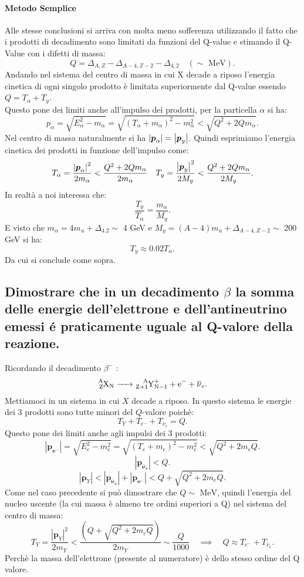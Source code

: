 \paragraph{Metodo Semplice}%
Alle stesse conclusioni si arriva con molta meno sofferenza utilizzando il fatto che i prodotti di decadimento sono limitati da funzioni del Q-value e stimando il Q-Value con i difetti di massa:
\[
	Q = \Delta_{A,Z} - \Delta_{A-4,Z-2} -\Delta_{4,2} \quad \left( \sim \text{ MeV} \right) 
.\]
Andando nel sistema del centro di massa in cui X decade a riposo l'energia cinetica di ogni singolo prodotto è limitata superiormente dal Q-value essendo $Q = T_{\alpha}+ T_{y}$.\\
Questo pone dei limiti anche all'impulso dei prodotti, per la particella $\alpha$ si ha:
\[
	p_{\alpha}= \sqrt{E_{\alpha}^2-m_{\alpha}}= \sqrt{\left( T_{\alpha}+m_{\alpha}\right)^2- m_{\alpha}^2 } < \sqrt{Q^2+2Qm_{\alpha}} 
.\] 
Nel centro di massa naturalmente si ha $\left| \boldsymbol{p}_{\alpha} \right| = \left| \boldsymbol{p}_{y} \right| $. Quindi esprimiamo l'energia cinetica dei prodotti in  funzione dell'impulso come:
\begin{align*}
	&T_{\alpha} = \frac{\left| \boldsymbol{p}_{\alpha} \right|^2 }{2m_{\alpha}}< \frac{Q^2+2Qm_{\alpha}}{2m_{\alpha}} 
	&T_{y} =  \frac{\left| \boldsymbol{p}_{y} \right|^2 }{2M_{y}}< \frac{Q^2+2Qm_{\alpha}}{2M_{y}} 
.\end{align*}
In realtà a noi interessa che:
\[
	\frac{T_{y}}{T_{\alpha}}= \frac{m_{\alpha}}{M_{y}}
.\] 
E visto che $m_{\alpha} = 4 m_{u} + \Delta_{4.2} \sim$ 4 GeV e $M_{y}=\left(A-4\right)m_{u}+ \Delta_{A-4, Z-2}\sim$ 200 GeV si ha:
\[
	T_{y} \approx 0.02 T_{\alpha}
.\] 
Da cui si conclude come sopra.


\subsection[\hspace{2mm} Considerazione energetica sul decadimento $\beta$]{Dimostrare che in un decadimento $\beta$ la somma delle energie dell'elettrone e dell'antineutrino emessi é praticamente uguale al Q-valore della reazione.}
Ricordando il decadimento $\beta^-$ :
\[
\ce{\ce{^{A}_{Z}X_{N}} -> \ce{^{A}_{Z+1}Y^+_{N-1}} + e^- + \overline{\nu}_e}
.\]
Mettiamoci in un sistema in cui $X$ decade a riposo. In questo sistema le energie dei 3 prodotti sono tutte minori del $Q$-valore poichè:
\[
T_Y + T_{e^-} + T_{\overline{\nu}_e} = Q
.\] 
Questo pone dei limiti anche agli impulsi dei 3 prodotti:
\[
	\left| \boldsymbol{p_{e^-}} \right| = \sqrt{E_e^2 - m_e^2}  = \sqrt{\left( T_e + m_e \right)^2 - m_e^2 } < \sqrt{Q^2+2m_eQ}  
.\] 
\[
	\left| \boldsymbol{p_{\overline{\nu}_e}} \right| < Q 
.\]
\[
\left| \boldsymbol{p}_Y \right| <  \left| \boldsymbol{p_{\overline{\nu}_e}} \right| + \left| \boldsymbol{p_{e^-}} \right| < Q + \sqrt{Q^2+2m_eQ} 
.\] 
Come nel caso precedente si può dimostrare che $Q \sim \text{ MeV}$, quindi l'energia del nucleo uscente (la cui massa è almeno tre ordini superiori a Q) nel sistema del centro di massa:
\[
	T_{Y} = \frac{\left| \boldsymbol{p}_Y \right|^2 }{2m_Y} < \frac{\left( Q + \sqrt{Q^2+2m_e Q}  \right) }{2m_Y}  \sim \frac{Q}{1000} \quad \implies
	\quad Q \approx T_{e^-} + T_{\overline{\nu}_e} 
.\] 
Perchè la massa dell'elettrone (presente al numeratore) è dello stesso ordine del Q valore.
